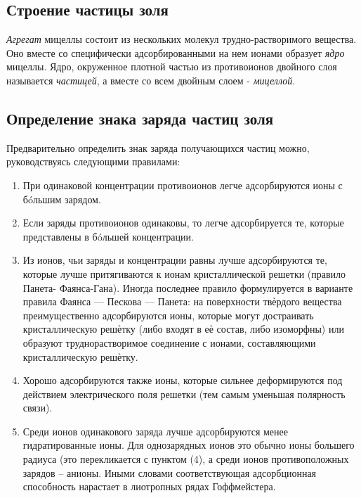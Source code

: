 \documentclass[a4paper, 12pt]{article}
\begin{document}
\subsection{Строение частицы золя}
\textit{Агрегат} мицеллы состоит из нескольких молекул трудно-растворимого вещества. Оно вместе со специфически адсорбированными на нем ионами образует \textit{ядро} мицеллы. Ядро, окруженное плотной частью из противоионов двойного слоя называется \textit{частицей}, а вместе со всем двойным слоем - \textit{мицеллой}.

\subsection{Определение знака заряда частиц золя}
Предварительно определить знак заряда получающихся частиц можно, руководствуясь следующими правилами:
\begin{enumerate}
    \item При одинаковой концентрации противоионов легче адсорбируются ионы с бóльшим зарядом.
    \item Если заряды противоионов одинаковы, то легче адсорбируется те, которые представлены в бóльшей концентрации.
    \item Из ионов, чьи заряды и концентрации равны лучше адсорбируются те, которые
лучше притягиваются к ионам кристаллической решетки (правило Панета-
Фаянса-Гана). Иногда последнее правило формулируется в варианте правила
Фаянса — Пескова — Панета: на поверхности твѐрдого вещества
преимущественно адсорбируются ионы, которые могут достраивать
кристаллическую решѐтку (либо входят в еѐ состав, либо изоморфны) или
образуют труднорастворимое соединение с ионами, составляющими
кристаллическую решѐтку.
    \item Хорошо адсорбируются также ионы, которые сильнее деформируются под
действием электрического поля решетки (тем самым уменьшая полярность связи).
    \item Среди ионов одинакового заряда лучше адсорбируются менее гидратированные
ионы. Для однозарядных ионов это обычно ионы большего радиуса (это
перекликается с пунктом (4), а среди ионов противоположных зарядов – анионы.
Иными словами соответствующая адсорбционная способность нарастает в
лиотропных рядах Гоффмейстера.
\end{enumerate}
\end{document}
